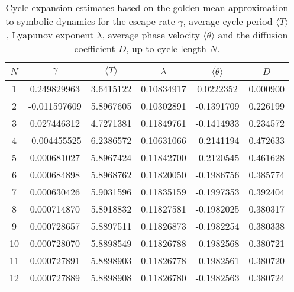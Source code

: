 \begin{table}
	\begin{tabular}{c|c|c|c|c|c}
	 $N$ & $\gamma$ & $\langle T \rangle$ & $\lambda$ & $\langle \dot{\theta} \rangle$ & $D$ \\
	\hline
	1 & 0.249829963 & 3.6415122 & 0.10834917 & 0.0222352 & 0.000900 \\
 	2 & -0.011597609 & 5.8967605 & 0.10302891 & -0.1391709 & 0.226199 \\
 	3 & 0.027446312 & 4.7271381 & 0.11849761 & -0.1414933 & 0.234572 \\
 	4 & -0.004455525 & 6.2386572 & 0.10631066 & -0.2141194 & 0.472633 \\
 	5 & 0.000681027 & 5.8967424 & 0.11842700 & -0.2120545 & 0.461628 \\
 	6 & 0.000684898 & 5.8968762 & 0.11820050 & -0.1986756 & 0.385774 \\
 	7 & 0.000630426 & 5.9031596 & 0.11835159 & -0.1997353 & 0.392404 \\
 	8 & 0.000714870 & 5.8918832 & 0.11827581 & -0.1982025 & 0.380317 \\
 	9 & 0.000728657 & 5.8897511 & 0.11826873 & -0.1982254 & 0.380338 \\
 	10 & 0.000728070 & 5.8898549 & 0.11826788 & -0.1982568 & 0.380721 \\
 	11 & 0.000727891 & 5.8898903 & 0.11826778 & -0.1982561 & 0.380720 \\
 	12 & 0.000727889 & 5.8898908 & 0.11826780 & -0.1982563 & 0.380724 \\
 	\end{tabular}
	\caption{Cycle expansion estimates based on the golden mean approximation
              to symbolic dynamics for
             the escape rate $\gamma$, average cycle period $\langle T \rangle$,
             Lyapunov exponent $\lambda$, average phase velocity
             $\langle \dot{\theta} \rangle$ and the diffusion coefficient $D$,
             up to cycle length $N$.}
	\label{t-DynamicalAverages}
\end{table}
